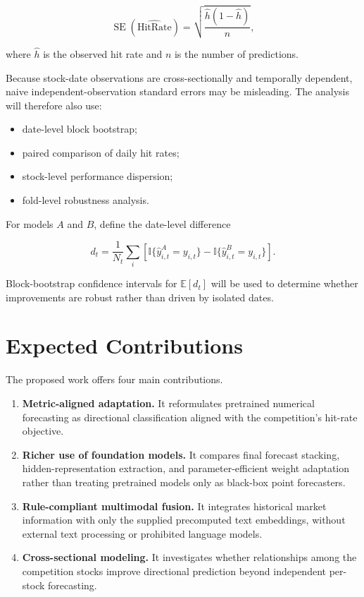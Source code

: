\documentclass[11pt]{article}
\newcommand{\E}{\mathbb{E}}
\newcommand{\ind}{\mathbb{I}}
\begin{document}
\begin{equation}
\operatorname{SE}
\left(
\widehat{\mathrm{HitRate}}
\right)
=
\sqrt{
\frac{
\widehat h(1-\widehat h)
}{
n
}
},
\end{equation}

where $\widehat h$ is the observed hit rate and $n$ is the number of predictions.

Because stock-date observations are cross-sectionally and temporally
dependent, naive independent-observation standard errors may be misleading.
The analysis will therefore also use:

\begin{itemize}
    \item date-level block bootstrap;
    \item paired comparison of daily hit rates;
    \item stock-level performance dispersion;
    \item fold-level robustness analysis.
\end{itemize}

For models $A$ and $B$, define the date-level difference

\begin{equation}
d_t
=
\frac{1}{N_t}
\sum_i
\left[
\ind\{\widehat y^A_{i,t}=y_{i,t}\}
-
\ind\{\widehat y^B_{i,t}=y_{i,t}\}
\right].
\end{equation}

Block-bootstrap confidence intervals for $\E[d_t]$ will be used to determine
whether improvements are robust rather than driven by isolated dates.

\section{Expected Contributions}

The proposed work offers four main contributions.

\begin{enumerate}
    \item \textbf{Metric-aligned adaptation.}
    It reformulates pretrained numerical forecasting as directional
    classification aligned with the competition's hit-rate objective.

    \item \textbf{Richer use of foundation models.}
    It compares final forecast stacking, hidden-representation extraction, and
    parameter-efficient weight adaptation rather than treating pretrained
    models only as black-box point forecasters.

    \item \textbf{Rule-compliant multimodal fusion.}
    It integrates historical market information with only the supplied
    precomputed text embeddings, without external text processing or
    prohibited language models.

    \item \textbf{Cross-sectional modeling.}
    It investigates whether relationships among the competition stocks improve
    directional prediction beyond independent per-stock forecasting.
\end{enumerate}
\end{document}
